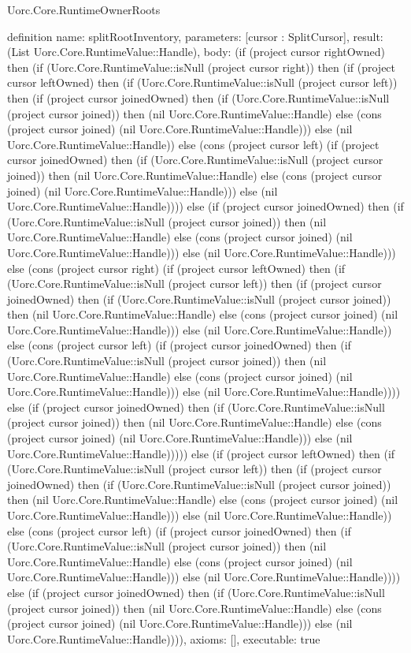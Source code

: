 \begin{lexlean}{Uorc.Core.RuntimeOwnerRoots}
\begin{semanticmodule}
definition{
  name: splitRootInventory,
  parameters: [cursor : SplitCursor],
  result: (List Uorc.Core.RuntimeValue::Handle),
  body: (if (project cursor rightOwned) then (if (Uorc.Core.RuntimeValue::isNull (project cursor right)) then (if (project cursor leftOwned) then (if (Uorc.Core.RuntimeValue::isNull (project cursor left)) then (if (project cursor joinedOwned) then (if (Uorc.Core.RuntimeValue::isNull (project cursor joined)) then (nil Uorc.Core.RuntimeValue::Handle) else (cons (project cursor joined) (nil Uorc.Core.RuntimeValue::Handle))) else (nil Uorc.Core.RuntimeValue::Handle)) else (cons (project cursor left) (if (project cursor joinedOwned) then (if (Uorc.Core.RuntimeValue::isNull (project cursor joined)) then (nil Uorc.Core.RuntimeValue::Handle) else (cons (project cursor joined) (nil Uorc.Core.RuntimeValue::Handle))) else (nil Uorc.Core.RuntimeValue::Handle)))) else (if (project cursor joinedOwned) then (if (Uorc.Core.RuntimeValue::isNull (project cursor joined)) then (nil Uorc.Core.RuntimeValue::Handle) else (cons (project cursor joined) (nil Uorc.Core.RuntimeValue::Handle))) else (nil Uorc.Core.RuntimeValue::Handle))) else (cons (project cursor right) (if (project cursor leftOwned) then (if (Uorc.Core.RuntimeValue::isNull (project cursor left)) then (if (project cursor joinedOwned) then (if (Uorc.Core.RuntimeValue::isNull (project cursor joined)) then (nil Uorc.Core.RuntimeValue::Handle) else (cons (project cursor joined) (nil Uorc.Core.RuntimeValue::Handle))) else (nil Uorc.Core.RuntimeValue::Handle)) else (cons (project cursor left) (if (project cursor joinedOwned) then (if (Uorc.Core.RuntimeValue::isNull (project cursor joined)) then (nil Uorc.Core.RuntimeValue::Handle) else (cons (project cursor joined) (nil Uorc.Core.RuntimeValue::Handle))) else (nil Uorc.Core.RuntimeValue::Handle)))) else (if (project cursor joinedOwned) then (if (Uorc.Core.RuntimeValue::isNull (project cursor joined)) then (nil Uorc.Core.RuntimeValue::Handle) else (cons (project cursor joined) (nil Uorc.Core.RuntimeValue::Handle))) else (nil Uorc.Core.RuntimeValue::Handle))))) else (if (project cursor leftOwned) then (if (Uorc.Core.RuntimeValue::isNull (project cursor left)) then (if (project cursor joinedOwned) then (if (Uorc.Core.RuntimeValue::isNull (project cursor joined)) then (nil Uorc.Core.RuntimeValue::Handle) else (cons (project cursor joined) (nil Uorc.Core.RuntimeValue::Handle))) else (nil Uorc.Core.RuntimeValue::Handle)) else (cons (project cursor left) (if (project cursor joinedOwned) then (if (Uorc.Core.RuntimeValue::isNull (project cursor joined)) then (nil Uorc.Core.RuntimeValue::Handle) else (cons (project cursor joined) (nil Uorc.Core.RuntimeValue::Handle))) else (nil Uorc.Core.RuntimeValue::Handle)))) else (if (project cursor joinedOwned) then (if (Uorc.Core.RuntimeValue::isNull (project cursor joined)) then (nil Uorc.Core.RuntimeValue::Handle) else (cons (project cursor joined) (nil Uorc.Core.RuntimeValue::Handle))) else (nil Uorc.Core.RuntimeValue::Handle)))),
  axioms: [],
  executable: true
}
\end{semanticmodule}
\end{lexlean}
